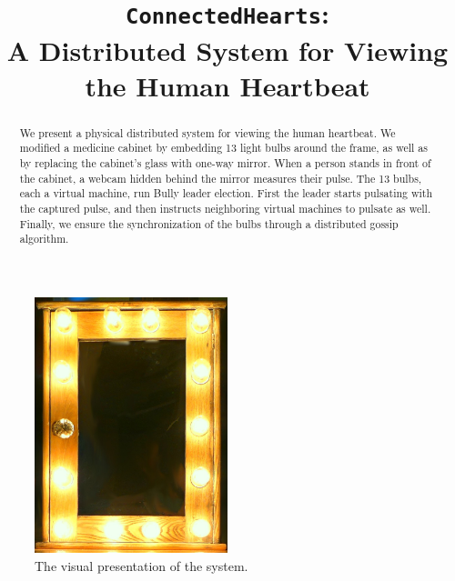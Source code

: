 \documentclass[preprint,review,12pt]{cs262}
\begin{document}
\begin{frontmatter}

\title{\texttt{ConnectedHearts}: \\ A Distributed System for Viewing the Human Heartbeat}



\begin{abstract}
We present a physical distributed system for viewing the human heartbeat. We modified a medicine cabinet by embedding 13 light bulbs around the frame, as well as by replacing the cabinet's glass with one-way mirror. When a person stands in front of the cabinet, a webcam hidden behind the mirror measures their pulse. The 13 bulbs, each a virtual machine, run Bully leader election. First the leader starts pulsating with the captured pulse, and then instructs neighboring virtual machines to pulsate as well. Finally, we ensure the synchronization of the bulbs through a distributed gossip algorithm.
\end{abstract}


\end{frontmatter}





\begin{figure}[h]
  \centering
  \includegraphics[width=0.5\textwidth]{figures/bulbs.JPG}
  \caption{The visual presentation of the system. 
 \label{fig:layout}}
\end{figure}
\end{document}
